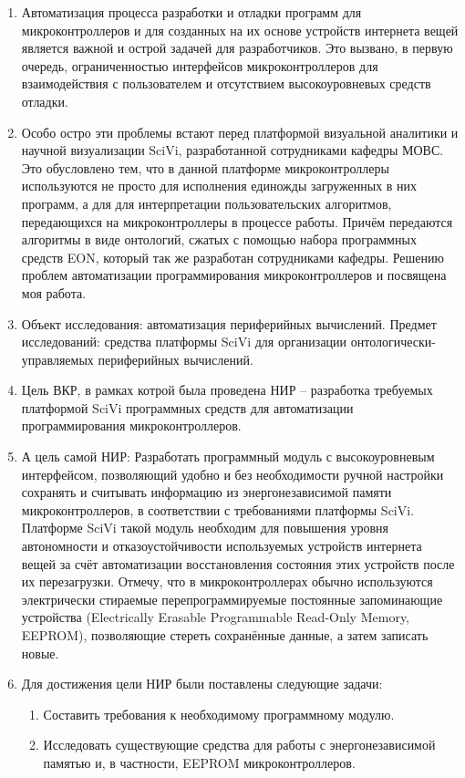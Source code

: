 \documentclass[14pt]{extarticle}
\begin{document}
\begin{enumerate}
	\item Автоматизация процесса разработки и отладки программ для микроконтроллеров и для созданных на их основе устройств интернета вещей является важной и острой задачей для разработчиков.
	Это вызвано, в первую очередь, ограниченностью интерфейсов микроконтроллеров для взаимодействия с пользователем и отсутствием высокоуровневых средств отладки.
	\item Особо остро эти проблемы встают перед платформой визуальной аналитики и научной визуализации SciVi, разработанной сотрудниками кафедры МОВС.
	Это обусловлено тем, что в данной платформе микроконтроллеры используются не просто для исполнения единожды загруженных в них программ, а для для интерпретации пользовательских алгоритмов, передающихся на микроконтроллеры в процессе работы.
	Причём передаются алгоритмы в виде онтологий, сжатых с помощью набора программных средств EON, который так же разработан сотрудниками кафедры.
	Решению проблем автоматизации программирования микроконтроллеров и посвящена моя работа.
	\item
	Объект исследования:  автоматизация периферийных вычислений.
	Предмет исследований: средства платформы SciVi для организации онтологически-управляемых периферийных вычислений.
	\item Цель ВКР, в рамках котрой была проведена НИР -- разработка требуемых платформой SciVi программных средств для автоматизации программирования микроконтроллеров.
	\item А цель самой НИР: Разработать программный модуль с высокоуровневым интерфейсом, позволяющий удобно и без необходимости ручной настройки сохранять и считывать информацию из энергонезависимой памяти микроконтроллеров, в соответствии с требованиями платформы SciVi.
	Платформе SciVi такой модуль необходим для повышения уровня автономности и отказоустойчивости используемых устройств интернета вещей за счёт автоматизации восстановления состояния этих устройств после их перезагрузки.
	Отмечу, что в микроконтроллерах обычно используются электрически стираемые перепрограммируемые постоянные запоминающие устройства (Electrically Erasable Programmable Read-Only Memory, EEPROM), позволяющие стереть сохранённые данные, а затем записать новые.
	\item Для достижения цели НИР были поставлены следующие задачи:
	\begin{enumerate}
		\item Составить требования к необходимому программному модулю.
		\item Исследовать существующие средства для работы с энергонезависимой памятью и, в частности, EEPROM микроконтроллеров.

\end{enumerate}
\end{enumerate}
\end{document}
